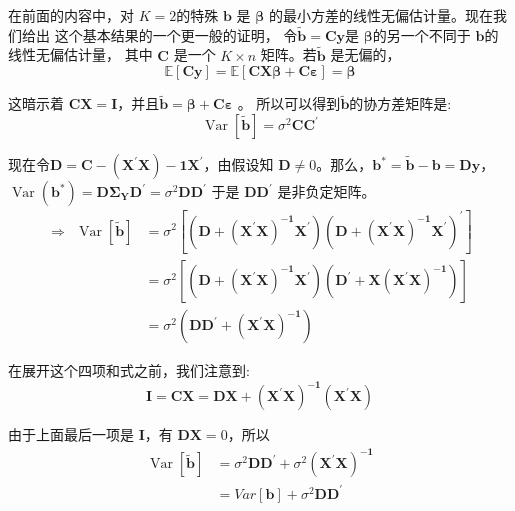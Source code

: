     在前面的内容中，对 $ K = 2 $的特殊 $ \boldsymbol{b} $ 是 $ \boldsymbol{\beta} $  的最小方差的线性无偏估计量。现在我们给出 这个基本结果的一个更一般的证明，
    令$ \widetilde{\boldsymbol{b}}= \boldsymbol{C y} $是 $ \boldsymbol{\beta} $的另一个不同于 $ \boldsymbol{b} $的线性无偏估计量， 
    其中 $ \boldsymbol{C} $ 是一个 $ K \times n $ 矩阵。若$ \widetilde{\boldsymbol{b}}$ 是无偏的，
   $$ \mathbb{E}[\boldsymbol{C y}]=\mathbb{E}[ \boldsymbol{C X \beta+C \varepsilon}]= \boldsymbol{\beta} $$

    这暗示着 $ \boldsymbol{CX = I}$，并且$ \widetilde{\boldsymbol{b}} = \boldsymbol{\beta  + C \varepsilon} $ 。
    所以可以得到$ \widetilde{\boldsymbol{b}}$的协方差矩阵是:
    $$ \operatorname{Var}[\tilde{\boldsymbol{b}}]=\sigma^{2} \boldsymbol{C C^{\prime}} $$ 

    现在令$ \boldsymbol{D = C − ( X^{\prime} X ) −1 X^{\prime}} $，由假设知 $ \boldsymbol{D} \neq  0 $。那么，$ \boldsymbol{b}^{*}=\tilde{\boldsymbol{b}}-\boldsymbol{b=D y}$，
     $ \operatorname{Var}\left(\boldsymbol{b}^{*}\right)=\boldsymbol{D \Sigma_{Y} D^{\prime}}=\sigma^{2} \boldsymbol{D D^{\prime}} $
    于是 $ \boldsymbol{DD^{\prime}} $ 是非负定矩阵。
    $$ \begin{aligned}
        \Longrightarrow  \ \ \operatorname{Var}[\tilde{\boldsymbol{b}}] 
        &=\sigma^{2}\boldsymbol{\left[\left(D+\left(X^{\prime} X\right)^{-1} X^{\prime}\right)\left(D+\left(X^{\prime} X\right)^{-1} X^{\prime}\right)^{\prime}\right]} \\
        &=\sigma^{2}\boldsymbol{\left[\left(D+\left(X^{\prime} X\right)^{-1} X^{\prime}\right)\left(D^{\prime}+X\left(X^{\prime} X\right)^{-1}\right)\right]} \\
        &=\sigma^{2}\boldsymbol{\left(D D^{\prime}+\left(X^{\prime} X\right)^{-1}\right)}
        \end{aligned}  $$

    在展开这个四项和式之前，我们注意到:
    $$ \boldsymbol{I=C X=D X+\left(X^{\prime} X\right)^{-1}\left(X^{\prime} X\right)} $$ 

    由于上面最后一项是 $ \boldsymbol{I} $，有 $ \boldsymbol{DX}=0 $，所以
    $$ \begin{aligned}
        \operatorname{Var}[\tilde{\boldsymbol{b}}] &=\sigma^{2} \boldsymbol{D D^{\prime}}+\sigma^{2} \boldsymbol{ \left(X^{\prime} X\right)^{-1}} \\
        &=V a r[\boldsymbol{b}]+\sigma^{2} \boldsymbol{D D^{\prime}}
       \end{aligned} $$

